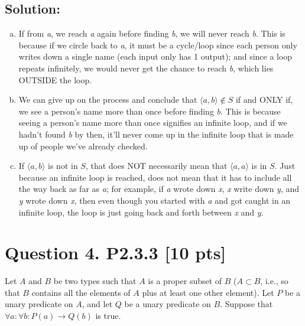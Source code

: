 \documentclass[12pt]{article}
\begin{document}
	\subsection*{\textbf{Solution:}} %
	\begin{enumerate}[(a)]
		\item If from \textit{a}, we reach \textit{a} again before finding \textit{b},
			we will never reach \textit{b}. This is because if we circle back to
			\textit{a}, it must be a cycle/loop since each person only writes down a
			single name (each input only has 1 output); and since a loop repeats infinitely,
			we would never get the chance to reach \textit{b}, which lies OUTSIDE the
			loop.

		\item We can give up on the process and conclude that $\langle a,b \rangle \not
			\in S$ if and ONLY if, we see a person's name more than once before
			finding \textit{b}. This is because seeing a person's name more than once
			signifies an infinite loop, and if we hadn't found \textit{b} by then, it'll
			never come up in the infinite loop that is made up of people we've already
			checked.

		\item If $\langle a, b\rangle$ is not in $S$, that does NOT necessarily mean
			that $\langle a, a\rangle$ is in $S$. Just because an infinite loop is reached,
			does not mean that it has to include all the way back as far as \textit{a};
			for example, if \textit{a} wrote down \textit{x}, \textit{x} write down \textit{y},
			and \textit{y} wrote down \textit{x}, then even though you started with
			\textit{a} and got caught in an infinite loop, the loop is just going back
			and forth between \textit{x} and \textit{y}.
	\end{enumerate}

	\newpage

	\section*{\textbf{Question 4. P2.3.3} [10 pts]}
	Let $A$ and $B$ be two types such that $A$ is a proper subset of $B$ ($A \subset
	B$, i.e., so that $B$ contains all the elements of $A$ plus at least one other
	element). Let $P$ be a unary predicate on $A$, and let $Q$ be a unary predicate
	on $B$. Suppose that $\forall a: \forall b : P(a) \rightarrow Q(b)$ is true.
\end{document}
